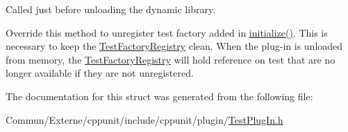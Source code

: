 Called just before unloading the dynamic library. 

Override this method to unregister test factory added in \hyperlink{struct_cpp_unit_test_plug_in_aec670330e7fced26c2a66b1dcd56edc0}{initialize()}. This is necessary to keep the \hyperlink{class_test_factory_registry}{Test\+Factory\+Registry} \textquotesingle{}clean\textquotesingle{}. When the plug-\/in is unloaded from memory, the \hyperlink{class_test_factory_registry}{Test\+Factory\+Registry} will hold reference on test that are no longer available if they are not unregistered. 

The documentation for this struct was generated from the following file\+:\begin{DoxyCompactItemize}
\item 
Commun/\+Externe/cppunit/include/cppunit/plugin/\hyperlink{_test_plug_in_8h}{Test\+Plug\+In.\+h}\end{DoxyCompactItemize}
